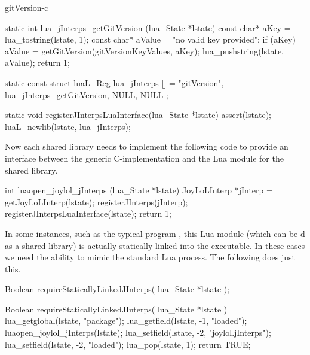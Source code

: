 \stopTestCase
\stopTestSuite

\component gitVersion-c

\startCCode
static int lua_jInterps_getGitVersion (lua_State *lstate) {
  const char* aKey   = lua_tostring(lstate, 1);
  const char* aValue = "no valid key provided";
  if (aKey) aValue = getGitVersion(gitVersionKeyValues, aKey);
  lua_pushstring(lstate, aValue);
  return 1;
}
\stopCCode

\startCCode
static const struct luaL_Reg lua_jInterps [] = {
  {"gitVersion", lua_jInterps_getGitVersion},
  {NULL, NULL}
};
\stopCCode

\startCCode
static void registerJInterpsLuaInterface(lua_State *lstate) {
  assert(lstate);
  luaL_newlib(lstate, lua_jInterps);
}
\stopCCode

Now each shared library needs to implement the following code to provide 
an interface between the generic C-implementation and the Lua module for 
the shared library. 

\startCCode
int luaopen_joylol_jInterps (lua_State *lstate) {
  JoyLoLInterp *jInterp = getJoyLoLInterp(lstate);
  registerJInterps(jInterp);
  registerJInterpsLuaInterface(lstate);
  return 1;
}
\stopCCode

In some instances, such as the typical  program 
, this Lua module (which can be d as a 
shared library) is actually statically linked into the executable. In 
these cases we need the ability to mimic the standard Lua  
process. The following  does just this. 

\startCHeader
Boolean requireStaticallyLinkedJInterps(
  lua_State *lstate
);
\stopCHeader

\startCCode
Boolean requireStaticallyLinkedJInterps(
  lua_State *lstate
) {
  lua_getglobal(lstate, "package");
  lua_getfield(lstate, -1, "loaded");
  luaopen_joylol_jInterps(lstate);
  lua_setfield(lstate, -2, "joylol.jInterps");
  lua_setfield(lstate, -2, "loaded");
  lua_pop(lstate, 1);
  return TRUE;
}
\stopCCode
